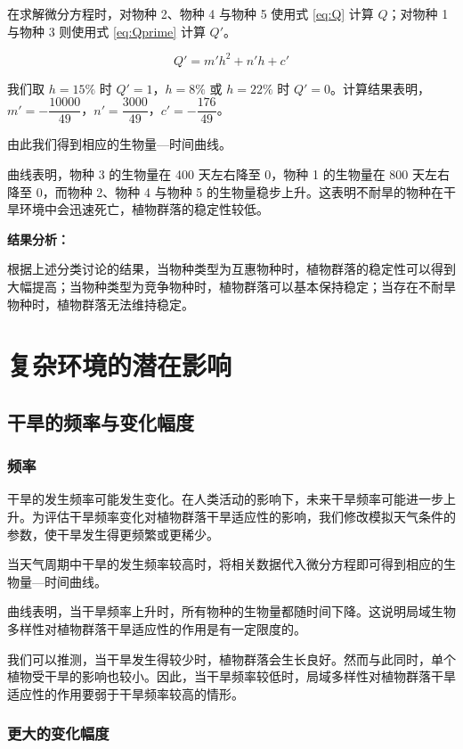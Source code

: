 \documentclass[11pt,a4paper]{ctexart}
\begin{document}
在求解微分方程时，对物种 2、物种 4 与物种 5 使用式 \eqref{eq:Q} 计算 $Q$；对物种 1 与物种 3 则使用式 \eqref{eq:Qprime} 计算 $Q'$。

\begin{equation}
Q'=m'h^{2}+n'h+c'
\label{eq:Qprime}
\end{equation}

我们取 $h=15\%$ 时 $Q'=1$，$h=8\%$ 或 $h=22\%$ 时 $Q'=0$。计算结果表明，$m'=-\dfrac{10000}{49}$，$n'=\dfrac{3000}{49}$，$c'=-\dfrac{176}{49}$。

由此我们得到相应的生物量—时间曲线。

曲线表明，物种 3 的生物量在 400 天左右降至 0，物种 1 的生物量在 800 天左右降至 0，而物种 2、物种 4 与物种 5 的生物量稳步上升。这表明不耐旱的物种在干旱环境中会迅速死亡，植物群落的稳定性较低。

\textbf{结果分析：}

根据上述分类讨论的结果，当物种类型为互惠物种时，植物群落的稳定性可以得到大幅提高；当物种类型为竞争物种时，植物群落可以基本保持稳定；当存在不耐旱物种时，植物群落无法维持稳定。

\section{复杂环境的潜在影响}

\subsection{干旱的频率与变化幅度}

\subsubsection{频率}

干旱的发生频率可能发生变化。在人类活动的影响下，未来干旱频率可能进一步上升。为评估干旱频率变化对植物群落干旱适应性的影响，我们修改模拟天气条件的参数，使干旱发生得更频繁或更稀少。

当天气周期中干旱的发生频率较高时，将相关数据代入微分方程即可得到相应的生物量—时间曲线。

曲线表明，当干旱频率上升时，所有物种的生物量都随时间下降。这说明局域生物多样性对植物群落干旱适应性的作用是有一定限度的。

我们可以推测，当干旱发生得较少时，植物群落会生长良好。然而与此同时，单个植物受干旱的影响也较小。因此，当干旱频率较低时，局域多样性对植物群落干旱适应性的作用要弱于干旱频率较高的情形。

\subsubsection{更大的变化幅度}
\end{document}
